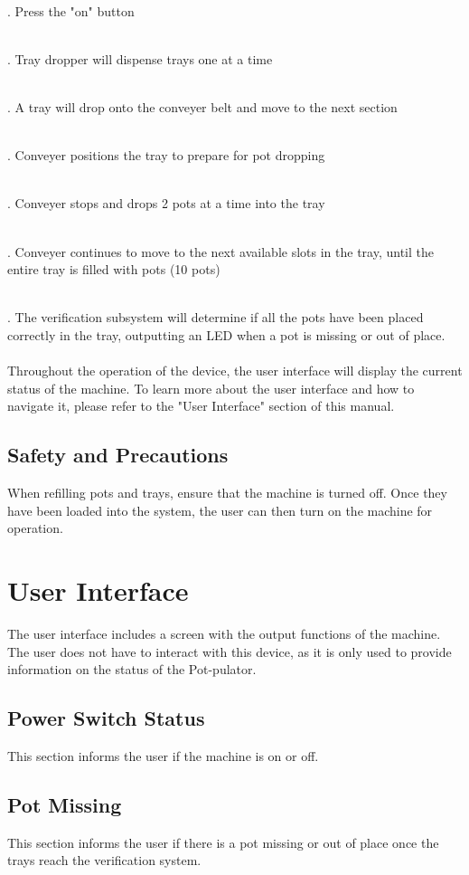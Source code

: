 \documentclass{article}
\begin{document}
\\ .	Press the "on" button

\\ .	Tray dropper will dispense trays one at a time

\\ .	A tray will drop onto the conveyer belt and move to the next section

\\ .	Conveyer positions the tray to prepare for pot dropping

\\ .	Conveyer stops and drops 2 pots at a time into the tray

\\ .	Conveyer continues to move to the next available slots in the tray, until the entire tray is filled with pots (10 pots)

\\ .	The verification subsystem will determine if all the pots have been placed correctly in the tray, outputting an LED when a pot is missing or out of place. 
\\
\\ \noindent Throughout the operation of the device, the user interface will display the current status of the machine. To learn more about the user interface and how to navigate it, please refer to the "User Interface" section of this manual.
\subsection{Safety and Precautions}
When refilling pots and trays, ensure that the machine is turned off. Once they have been loaded into the system, the user can then turn on the machine for operation.
\section{User Interface}
The user interface includes a screen with the output functions of the machine. The user does not have to interact with this device, as it is only used to provide information on the status of the Pot-pulator.
\subsection{Power Switch Status}
This section informs the user if the machine is on or off.
\subsection{Pot Missing}
This section informs the user if there is a pot missing or out of place once the trays reach the verification system.
\end{document}
